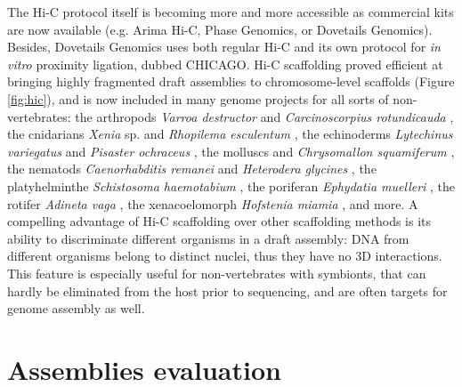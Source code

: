 The Hi-C protocol itself is becoming more and more accessible as commercial kits are now available (e.g. Arima Hi-C, Phase Genomics, or Dovetails Genomics). Besides, Dovetails Genomics uses both regular Hi-C and its own protocol for \textit{in vitro} proximity ligation, dubbed CHICAGO. Hi-C scaffolding proved efficient at bringing highly fragmented draft assemblies to chromosome-level scaffolds (Figure \ref{fig:hic}), and is now included in many genome projects for all sorts of non-vertebrates: the arthropods \textit{Varroa destructor} \cite{varroa_destructor} and \textit{Carcinoscorpius rotundicauda} \cite{carcinoscorpius_rotundicauda2}, the cnidarians \textit{Xenia} sp. \cite{xenia_sp} and \textit{Rhopilema esculentum} \cite{rhopilema_esculentum}, the echinoderms \textit{Lytechinus variegatus} \cite{lytechinus_variegatus} and \textit{Pisaster ochraceus} \cite{pisaster_ochraceus}, the molluscs \cite{scapharca_broughtonii} and \textit{Chrysomallon squamiferum} \cite{chrysomallon_squamiferum}, the nematods \textit{Caenorhabditis remanei} \cite{caenorhabditis_remanei2} and \textit{Heterodera glycines} \cite{heterodera_glycines2}, the platyhelminthe \textit{Schistosoma haemotabium} \cite{schistosoma_haematobium}, the poriferan \textit{Ephydatia muelleri} \cite{ephydatia_mulleri}, the rotifer \textit{Adineta vaga} \cite{adineta_vaga2}, the xenacoelomorph \textit{Hofstenia miamia} \cite{hofstenia_miamia}, and more. A compelling advantage of Hi-C scaffolding over other scaffolding methods is its ability to discriminate different organisms in a draft assembly: DNA from different organisms belong to distinct nuclei, thus they have no 3D interactions. This feature is especially useful for non-vertebrates with symbionts, that can hardly be eliminated from the host prior to sequencing, and are often targets for genome assembly as well. \\

\section{Assemblies evaluation}

